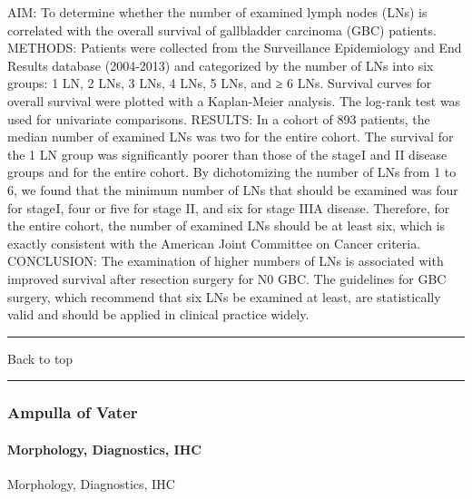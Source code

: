 \documentclass[]{article}
\let\oldparagraph\paragraph
\renewcommand{\paragraph}[1]{\oldparagraph{#1}\mbox{}}
\begin{document}
AIM: To determine whether the number of examined lymph nodes (LNs) is
correlated with the overall survival of gallbladder carcinoma (GBC)
patients. METHODS: Patients were collected from the Surveillance
Epidemiology and End Results database (2004-2013) and categorized by the
number of LNs into six groups: 1 LN, 2 LNs, 3 LNs, 4 LNs, 5 LNs, and ≥ 6
LNs. Survival curves for overall survival were plotted with a
Kaplan-Meier analysis. The log-rank test was used for univariate
comparisons. RESULTS: In a cohort of 893 patients, the median number of
examined LNs was two for the entire cohort. The survival for the 1 LN
group was significantly poorer than those of the stage I and II disease
groups and for the entire cohort. By dichotomizing the number of LNs
from 1 to 6, we found that the minimum number of LNs that should be
examined was four for stage I, four or five for stage II, and six for
stage IIIA disease. Therefore, for the entire cohort, the number of
examined LNs should be at least six, which is exactly consistent with
the American Joint Committee on Cancer criteria. CONCLUSION: The
examination of higher numbers of LNs is associated with improved
survival after resection surgery for N0 GBC. The guidelines for GBC
surgery, which recommend that six LNs be examined at least, are
statistically valid and should be applied in clinical practice widely.

{}

{}

\begin{center}\rule{0.5\linewidth}{\linethickness}\end{center}

Back to top

\begin{center}\rule{0.5\linewidth}{\linethickness}\end{center}

\pagebreak

\hypertarget{ampulla-of-vater}{%
\subsubsection{Ampulla of Vater}\label{ampulla-of-vater}}

\hypertarget{morphology-diagnostics-ihc-2}{%
\paragraph{Morphology, Diagnostics,
IHC}\label{morphology-diagnostics-ihc-2}}

Morphology, Diagnostics, IHC
\end{document}
